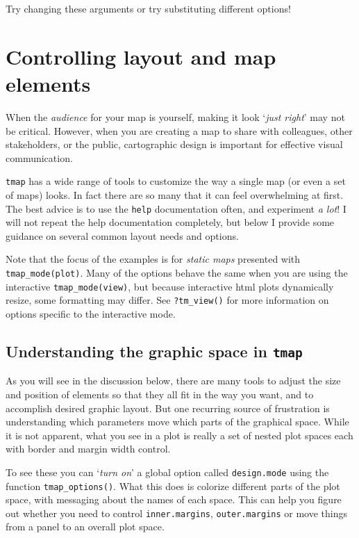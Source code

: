\documentclass[
]{book}
\begin{document}
Try changing these arguments or try substituting different options!

\hypertarget{controlling-layout-and-map-elements}{%
\section{Controlling layout and map elements}\label{controlling-layout-and-map-elements}}

When the \emph{audience} for your map is yourself, making it look `\emph{just right}' may not be critical. However, when you are creating a map to share with colleagues, other stakeholders, or the public, cartographic design is important for effective visual communication.

\texttt{tmap} has a wide range of tools to customize the way a single map (or even a set of maps) looks. In fact there are so many that it can feel overwhelming at first. The best advice is to use the \texttt{help} documentation often, and experiment \emph{a lot}! I will not repeat the help documentation completely, but below I provide some guidance on several common layout needs and options.

Note that the focus of the examples is for \emph{static maps} presented with \texttt{tmap\_mode(\textquotesingle{}plot\textquotesingle{})}. Many of the options behave the same when you are using the interactive \texttt{tmap\_mode(\textquotesingle{}view\textquotesingle{})}, but because interactive html plots dynamically resize, some formatting may differ. See \texttt{?tm\_view()} for more information on options specific to the interactive mode.

\hypertarget{understanding-the-graphic-space-in-tmap}{%
\subsection{\texorpdfstring{Understanding the graphic space in \texttt{tmap}}{Understanding the graphic space in tmap}}\label{understanding-the-graphic-space-in-tmap}}

As you will see in the discussion below, there are many tools to adjust the size and position of elements so that they all fit in the way you want, and to accomplish desired graphic layout. But one recurring source of frustration is understanding which parameters move which parts of the graphical space. While it is not apparent, what you see in a plot is really a set of nested plot spaces each with border and margin width control.

To see these you can `\emph{turn on}' a global option called \texttt{design.mode} using the function \texttt{tmap\_options()}. What this does is colorize different parts of the plot space, with messaging about the names of each space. This can help you figure out whether you need to control \texttt{inner.margins}, \texttt{outer.margins} or move things from a panel to an overall plot space.
\end{document}
